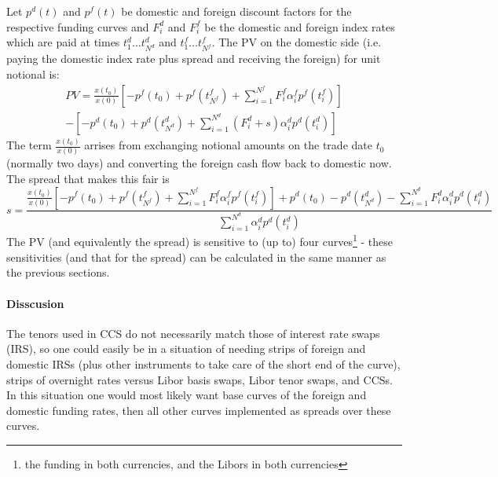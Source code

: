 Let $p^d(t)$ and $p^f(t)$ be domestic and foreign discount factors for the respective funding curves and $F^d_i$ and $F^f_i$ be the domestic and foreign index rates which are paid at times $t^d_1\ldots t^d_{N^d}$ and  $t^f_1\ldots t^f_{N^f}$. The PV on the domestic side (i.e. paying the domestic index rate plus spread and receiving the foreign) for unit notional is:
%
\begin{equation}
\begin{split}
PV =  \frac{x(t_0)}{x(0)}\left[-p^f(t_0) + p^f(t^f_{N^f}) +\sum^{N^f}_{i=1} F^f_i \alpha^{f}_ip^{f}(t^{f}_i)\right]\\
-\left[-p^d(t_0) + p^d(t^d_{N^d}) +\sum^{N^d}_{i=1}( F^d_i+s) \alpha^{d}_ip^{d}(t^{d}_i)\right]
\end{split}
\end{equation}
%
The term $\frac{x(t_0)}{x(0)}$ arrises from exchanging notional amounts on the trade date $t_0$ (normally two days) and converting the foreign cash flow back to domestic now. The spread that makes this fair is
%
\begin{equation}
s =  \frac{\frac{x(t_0)}{x(0)}\left[-p^f(t_0) + p^f(t^f_{N^f}) +\sum^{N^f}_{i=1} F^f_i \alpha^{f}_ip^{f}(t^{f}_i)\right]+p^d(t_0) -p^d(t^d_{N^d}) -\sum^{N^d}_{i=1}F^d_i \alpha^{d}_ip^{d}(t^{d}_i)}
{\sum^{N^d}_{i=1}\alpha^{d}_ip^{d}(t^{d}_i)}
\end{equation}
%
The PV (and equivalently the spread) is sensitive to (up to) four curves\footnote{the funding in both currencies, and the Libors in both currencies} - these sensitivities (and that for the spread) can be calculated in the same manner as the previous sections. 

\paragraph*{Disscusion}
The tenors used in CCS do not necessarily match those of interest rate swaps (IRS), so one could easily be in a situation of needing strips of foreign and domestic IRSs (plus other instruments to take care of the short end of the curve), strips of overnight rates versus Libor basis swaps, Libor tenor swaps, and CCSs. In this situation one would most likely want base curves of the foreign and domestic funding rates, then all other curves implemented as spreads over these curves.

